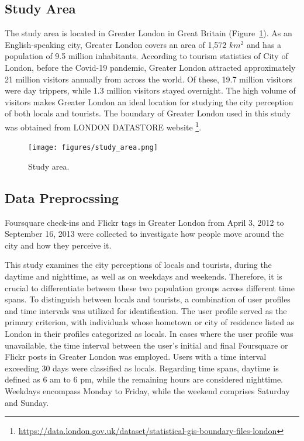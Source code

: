 \documentclass{article}
\theoremstyle{definition}
\theoremstyle{remark}
\begin{document}
\subsection{Study Area}
The study area is located in Greater London in Great Britain (Figure~\ref{fig:study_area}). As an English-speaking
city, Greater London covers an area of 1,572 \(km^2\) and has a population of 9.5 million inhabitants. According to tourism statistics of City of London, before the Covid-19 pandemic, Greater London attracted approximately 21 million visitors annually from across the world. Of these, 19.7 million visitors were day trippers, while 1.3 million visitors stayed overnight. The high volume of visitors makes Greater London an ideal location for studying the city perception of both locals and tourists. The boundary of Greater London used in this study was obtained from LONDON DATASTORE website \footnote{\url{https://data.london.gov.uk/dataset/statistical-gis-boundary-files-london}}.

\begin{figure}[h!]
\centering
\texttt{[image: figures/study\_area.png]}
\caption{\label{fig:study_area}Study area.}
\end{figure}

\subsection{Data Preprocssing} \label{data_preprocessing}
Foursquare check-ins and Flickr tags in Greater London from April 3, 2012 to September 16, 2013 were collected to investigate how people move around the city and how they perceive it.

This study examines the city perceptions of locals and tourists, during the daytime and nighttime, as well as on weekdays and weekends. Therefore, it is crucial to differentiate between these two population groups across different time spans. To distinguish between locals and tourists, a combination of user profiles and time intervals was utilized for identification. The user profile served as the primary criterion, with individuals whose hometown or city of residence listed as London in their profiles categorized as locals. In cases where the user profile was unavailable, the time interval between the user's initial and final Foursquare or Flickr posts in Greater London was employed. Users with a time interval exceeding 30 days were classified as locals. Regarding time spans, daytime is defined as 6 am to 6 pm, while the remaining hours are considered nighttime. Weekdays encompass Monday to Friday, while the weekend comprises Saturday and Sunday.
\end{document}
